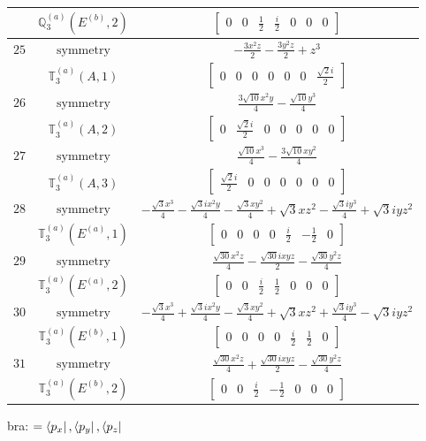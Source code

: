 \documentclass[fleqn,8pt,landscape]{jsarticle}
\begin{document}
\begin{longtable}{ccc}
$  $ & $ \mathbb{Q}_{3}^{(a)}(E^{(b)},2) $ & $ \begin{bmatrix} 0 & 0 & \frac{1}{2} & \frac{i}{2} & 0 & 0 & 0 \end{bmatrix} $ \\ \hline
$ 25 $ & $ \text{symmetry} $ & $ - \frac{3 x^{2} z}{2} - \frac{3 y^{2} z}{2} + z^{3} $ \\
$  $ & $ \mathbb{T}_{3}^{(a)}(A,1) $ & $ \begin{bmatrix} 0 & 0 & 0 & 0 & 0 & 0 & \frac{\sqrt{2} i}{2} \end{bmatrix} $ \\ \hline
$ 26 $ & $ \text{symmetry} $ & $ \frac{3 \sqrt{10} x^{2} y}{4} - \frac{\sqrt{10} y^{3}}{4} $ \\
$  $ & $ \mathbb{T}_{3}^{(a)}(A,2) $ & $ \begin{bmatrix} 0 & \frac{\sqrt{2} i}{2} & 0 & 0 & 0 & 0 & 0 \end{bmatrix} $ \\ \hline
$ 27 $ & $ \text{symmetry} $ & $ \frac{\sqrt{10} x^{3}}{4} - \frac{3 \sqrt{10} x y^{2}}{4} $ \\
$  $ & $ \mathbb{T}_{3}^{(a)}(A,3) $ & $ \begin{bmatrix} \frac{\sqrt{2} i}{2} & 0 & 0 & 0 & 0 & 0 & 0 \end{bmatrix} $ \\ \hline
$ 28 $ & $ \text{symmetry} $ & $ - \frac{\sqrt{3} x^{3}}{4} - \frac{\sqrt{3} i x^{2} y}{4} - \frac{\sqrt{3} x y^{2}}{4} + \sqrt{3} x z^{2} - \frac{\sqrt{3} i y^{3}}{4} + \sqrt{3} i y z^{2} $ \\
$  $ & $ \mathbb{T}_{3}^{(a)}(E^{(a)},1) $ & $ \begin{bmatrix} 0 & 0 & 0 & 0 & \frac{i}{2} & - \frac{1}{2} & 0 \end{bmatrix} $ \\ \hline
$ 29 $ & $ \text{symmetry} $ & $ \frac{\sqrt{30} x^{2} z}{4} - \frac{\sqrt{30} i x y z}{2} - \frac{\sqrt{30} y^{2} z}{4} $ \\
$  $ & $ \mathbb{T}_{3}^{(a)}(E^{(a)},2) $ & $ \begin{bmatrix} 0 & 0 & \frac{i}{2} & \frac{1}{2} & 0 & 0 & 0 \end{bmatrix} $ \\ \hline
$ 30 $ & $ \text{symmetry} $ & $ - \frac{\sqrt{3} x^{3}}{4} + \frac{\sqrt{3} i x^{2} y}{4} - \frac{\sqrt{3} x y^{2}}{4} + \sqrt{3} x z^{2} + \frac{\sqrt{3} i y^{3}}{4} - \sqrt{3} i y z^{2} $ \\
$  $ & $ \mathbb{T}_{3}^{(a)}(E^{(b)},1) $ & $ \begin{bmatrix} 0 & 0 & 0 & 0 & \frac{i}{2} & \frac{1}{2} & 0 \end{bmatrix} $ \\ \hline
$ 31 $ & $ \text{symmetry} $ & $ \frac{\sqrt{30} x^{2} z}{4} + \frac{\sqrt{30} i x y z}{2} - \frac{\sqrt{30} y^{2} z}{4} $ \\
$  $ & $ \mathbb{T}_{3}^{(a)}(E^{(b)},2) $ & $ \begin{bmatrix} 0 & 0 & \frac{i}{2} & - \frac{1}{2} & 0 & 0 & 0 \end{bmatrix} $ \\ \hline
\end{longtable}
bra: $=\bra{p_{x}}, \bra{p_{y}}, \bra{p_{z}}$
\end{document}
